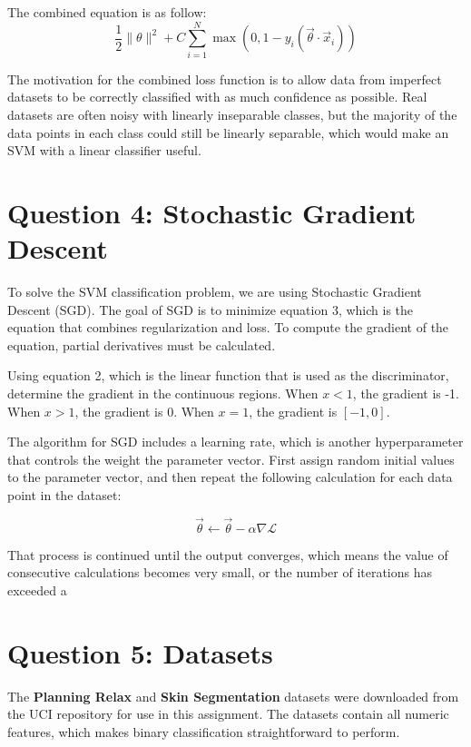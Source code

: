 \documentclass[letterpaper]{article}
\begin{document}
The combined equation is as follow:
\begin{equation}
    \frac{1}{2} \|\theta\|^2 + C \sum_{i=1}^{N} \max(0, 1 - y_i(\overrightarrow{\theta} \cdot \overrightarrow{x}_i))
\end{equation}

The motivation for the combined loss function is to allow data from imperfect datasets to be correctly classified with as much confidence as possible. Real datasets are often noisy with linearly inseparable classes, but the majority of the data points in each class could still be linearly separable, which would make an SVM with a linear classifier useful.

\section{Question 4: Stochastic Gradient Descent}
To solve the SVM classification problem, we are using Stochastic Gradient Descent (SGD). The goal of SGD is to minimize equation 3, which is the equation that combines regularization and loss. To compute the gradient of the equation, partial derivatives must be calculated.

Using equation 2, which is the linear function that is used as the discriminator, determine the gradient in the continuous regions. When $x < 1$, the gradient is -1. When $x > 1$, the gradient is 0. When $x = 1$, the gradient is $[-1, 0]$.

The algorithm for SGD includes a learning rate, which is another hyperparameter that controls the weight the parameter vector. First assign random initial values to the parameter vector, and then repeat the following calculation for each data point in the dataset:

\begin{equation}
    \overrightarrow{\theta} \leftarrow \overrightarrow{\theta} - \alpha \nabla \mathcal{L}
\end{equation}

That process is continued until the output converges, which means the value of consecutive calculations becomes very small, or the number of iterations has exceeded a 

\section{Question 5: Datasets}
The \textbf{Planning Relax} and \textbf{Skin Segmentation} datasets were downloaded from the UCI repository for use in this assignment. The datasets contain all numeric features, which makes binary classification straightforward to perform.
\end{document}
